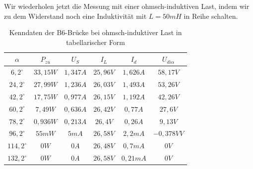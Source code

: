 \documentclass{article}
\begin{document}
Wir wiederholen jetzt die Messung mit einer ohmsch-induktiven Last, indem wir zu dem Widerstand noch eine Induktivität mit $L = 50mH$ in Reihe schalten.

\begin{table}[h]
  \centering
  \begin{tabular}{|c|c|c|c|c|c|}
    \hline
    $\alpha$ & $P_{zu}$ & $U_{S}$ & $I_{L}$ & $I_{d}$ & $U_{di\alpha}$\\
    \hline
    $6,2^{\circ}$ & $33,15W$ & $1,347A$ & $25,96V$ & $1,626A$ & $58,17V$ \\
    \hline
    $24,2^{\circ}$ & $27,99W$ & $1,236A$ & $26,03V$ & $1,493A$ & $53,26V$\\
    \hline
    $42,2^{\circ}$ & $17,75W$ & $0,977A$ & $26,15V$ & $1,192A$ & $42,26V$ \\
    \hline
    $60,2^{\circ}$ & $7,49W$ & $0,636A$ & $26,42V$ & $0,77A$ & $27,6V$ \\
    \hline
    $78,2^{\circ}$ & $0,936W$ & $0,213A$ & $26,4V$ & $0,26A$ & $9,13V$\\
    \hline
    $96,2^{\circ}$ & $55mW$ & $5mA$ & $26,58V$ & $2,2mA$ & $-0,378VV$\\
    \hline
    $114,2^{\circ}$ & $0W$ & $0A$ & $26,48V$ & $0,7mA$ & $0V$ \\
    \hline
    $132,2^{\circ}$ & $0W$ & $0A$ & $26,58V$ & $0,21mA$ & $0V$ \\
    \hline
  \end{tabular}
  \caption{Kenndaten der B6-Brücke bei ohmsch-induktiver Last in tabellarischer Form}
  \label{tab:mess2}
\end{table}
\end{document}
